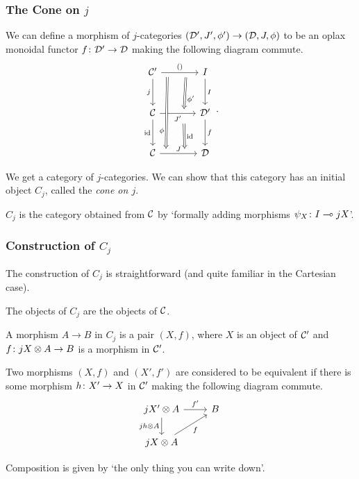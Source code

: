 \documentclass{beamer}
\begin{document}
\begin{frame}
  \frametitle{The Cone on $j$}

  We can define a morphism of $j$-categories $({\mathcal{D}}',J',\phi')\to({\mathcal{D}},J,\phi)$ to be an oplax monoidal functor $f\colon{\mathcal{D}}'\to{\mathcal{D}}$ making the following diagram commute.
  \[
    \begin{tikzcd}[row sep=large, column sep=large, ampersand replacement=\&]
      \C' \arrow[r, "()", ""'{name=term}] \arrow[d, "j"']
        \& I \arrow[d, "I"] \\
      \C \arrow[r, "J'"'{name=Jprimedown}, ""{name=Jprime}] \arrow[d, "\id"']
        \& \D' \arrow[d, "f"] \\
      \C \arrow[r, "J", ""{name=J}]
        \& \D
      \arrow[Rightarrow, from=term, to=Jprime, shift left=1.5ex, "\phi'"]
      \arrow[Rightarrow, from=Jprimedown, to=J, shift left=1.5ex, "\id"]
      \arrow[Rightarrow, from=term, to=J, shift right=3ex, "\phi"' near end]
    \end{tikzcd}\,.
    \]
  \pause

  We get a category of $j$-categories.  
  We can show that this category has an initial object $C_j$, called the \emph{cone on $j$}.
  \pause

  $C_j$ is the category obtained from ${\mathcal{C}}$ by `formally adding morphisms $\psi_X\colon I \multimap jX$'.
\end{frame}

\begin{frame}
  \frametitle{Construction of $C_j$}

  The construction of $C_j$ is straightforward (and quite familiar in the Cartesian case).
  \pause

  The objects of $C_j$ are the objects of ${\mathcal{C}}$.  

  A morphism $A\to B$ in $C_j$ is a pair $(X,f)$, where $X$ is an object of ${\mathcal{C}}'$ and $f\colon jX \otimes A \to B$ is a morphism in ${\mathcal{C}}'$.

  Two morphisms $(X, f)$ and $(X', f')$ are considered to be equivalent if there is some morphism $h\colon X'\to X$ in ${\mathcal{C}}'$ making the following diagram commute.
  \[
    \begin{tikzcd}[ampersand replacement=\&]
      j X' \tensor A \arrow[r, "f'"] \arrow[d, "j h \tensor A"']
        \& B \\
      j X \tensor A \arrow[ur, "f"']
        \&
    \end{tikzcd}
    \]
  \pause

  Composition is given by `the only thing you can write down'.
\end{frame}
\end{document}
